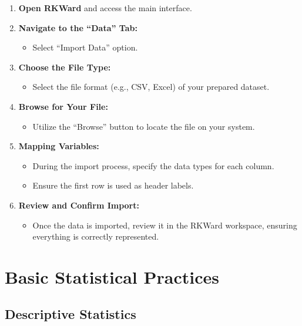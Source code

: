 \documentclass[
  letterpaper,
  DIV=11,
  numbers=noendperiod]{scrreprt}
\providecommand{\tightlist}{%
  \setlength{\itemsep}{0pt}\setlength{\parskip}{0pt}}
\begin{document}
\begin{enumerate}
\def\labelenumi{\arabic{enumi}.}
\tightlist
\item
  \textbf{Open RKWard} and access the main interface.
\item
  \textbf{Navigate to the ``Data'' Tab:}

  \begin{itemize}
  \tightlist
  \item
    Select ``Import Data'' option.
  \end{itemize}
\item
  \textbf{Choose the File Type:}

  \begin{itemize}
  \tightlist
  \item
    Select the file format (e.g., CSV, Excel) of your prepared dataset.
  \end{itemize}
\item
  \textbf{Browse for Your File:}

  \begin{itemize}
  \tightlist
  \item
    Utilize the ``Browse'' button to locate the file on your system.
  \end{itemize}
\item
  \textbf{Mapping Variables:}

  \begin{itemize}
  \tightlist
  \item
    During the import process, specify the data types for each column.
  \item
    Ensure the first row is used as header labels.
  \end{itemize}
\item
  \textbf{Review and Confirm Import:}

  \begin{itemize}
  \tightlist
  \item
    Once the data is imported, review it in the RKWard workspace,
    ensuring everything is correctly represented.
  \end{itemize}
\end{enumerate}


\chapter{Basic Statistical Practices}\label{basic-statistical-practices}

\section{Descriptive Statistics}\label{descriptive-statistics}
\end{document}

